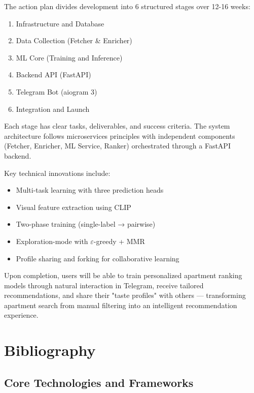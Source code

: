 \documentclass[12pt,a4paper]{article}
\begin{document}
The action plan divides development into 6 structured stages over 12-16 weeks:
\begin{enumerate}
    \item Infrastructure and Database
    \item Data Collection (Fetcher \& Enricher)
    \item ML Core (Training and Inference)
    \item Backend API (FastAPI)
    \item Telegram Bot (aiogram 3)
    \item Integration and Launch
\end{enumerate}

Each stage has clear tasks, deliverables, and success criteria. The system architecture follows microservices principles with independent components (Fetcher, Enricher, ML Service, Ranker) orchestrated through a FastAPI backend.

Key technical innovations include:
\begin{itemize}
    \item Multi-task learning with three prediction heads
    \item Visual feature extraction using CLIP
    \item Two-phase training (single-label → pairwise)
    \item Exploration-mode with $\varepsilon$-greedy + MMR
    \item Profile sharing and forking for collaborative learning
\end{itemize}

Upon completion, users will be able to train personalized apartment ranking models through natural interaction in Telegram, receive tailored recommendations, and share their "taste profiles" with others — transforming apartment search from manual filtering into an intelligent recommendation experience.

\newpage

\section{Bibliography}

\subsection{Core Technologies and Frameworks}
\end{document}
